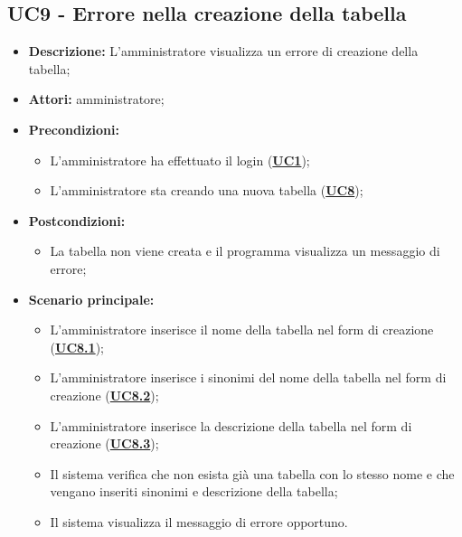 \subsection{UC9 - Errore nella creazione della tabella}
\label{sec:UC9}
\begin{itemize}
	\item \textbf{Descrizione:} L’amministratore visualizza un errore di creazione della tabella;
	\item \textbf{Attori:} amministratore;
	\item \textbf{Precondizioni:} 
	\begin{itemize}
		\item L’amministratore ha effettuato il login (\hyperref[sec:UC1]{\textbf{UC1}});
		\item L’amministratore sta creando una nuova tabella (\hyperref[sec:UC1]{\textbf{UC8}});
	\end{itemize}
	\item \textbf{Postcondizioni:} 
	\begin{itemize}
		\item La tabella non viene creata e il programma visualizza un messaggio di errore;
	\end{itemize}
	\item \textbf{Scenario principale:} 
	\begin{itemize}
		\item L’amministratore inserisce il nome della tabella nel form di creazione (\hyperref[sec:UC8.1]{\textbf{UC8.1}});
		\item L’amministratore inserisce i sinonimi del nome della tabella nel form di creazione (\hyperref[sec:UC8.2]{\textbf{UC8.2}});
		\item L’amministratore inserisce la descrizione della tabella nel form di creazione (\hyperref[sec:UC8.3]{\textbf{UC8.3}});
		\item Il sistema verifica che non esista già una tabella con lo stesso nome e che vengano inseriti sinonimi e descrizione della tabella;
		\item Il sistema visualizza il messaggio di errore opportuno.
	\end{itemize}
\end{itemize}

